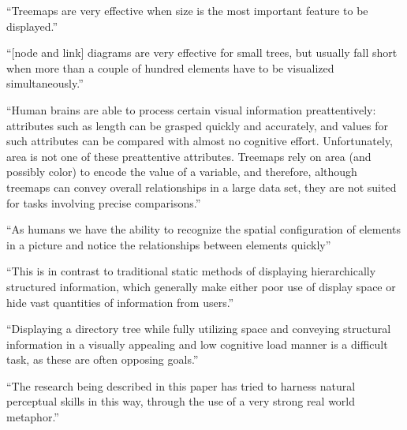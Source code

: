 \enquote{Treemaps are very effective when size is the most important feature to be displayed.}\cite[2]{bruls2000squarified}


\enquote{[node and link] diagrams are very effective for small trees, but usually fall short when more than a couple of hundred elements have to be visualized simultaneously.}\cite[2]{bruls2000squarified}

\enquote{Human brains are able to process certain visual information preattentively: attributes such as length can be grasped quickly and accurately, and values for such attributes can be compared with almost no cognitive effort. Unfortunately, area is not one of these preattentive attributes. Treemaps rely on area (and possibly color) to encode the value of a variable, and therefore, although treemaps can convey overall relationships in a large data set, they are not suited for tasks involving precise comparisons.}\cite{laubheimer_2019}

\enquote{As humans we have the ability to recognize the spatial configuration of
elements in a picture and notice the relationships between elements quickly}\cite[2]{johnson1998tree}

\enquote{This is in contrast to traditional static methods of displaying
hierarchically structured information, which generally make either poor use of
display space or hide vast quantities of information from users.}\cite[2]{johnson1998tree}

\enquote{Displaying a directory tree while fully utilizing space and conveying structural information in a visually appealing and low cognitive load manner is a difficult task, as these are often opposing goals.}\cite[8]{johnson1998tree}

\enquote{The research being described in this paper has tried to harness natural perceptual skills in this way, through the use of a very strong real world metaphor.}\cite[2]{virtualButVisibleMunro}

